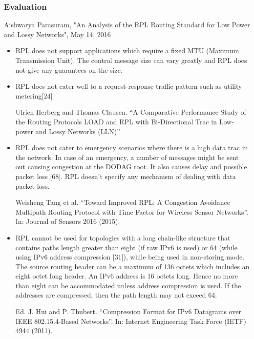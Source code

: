         \subsubsection{Evaluation}
        Aishwarya Parasuram, "An Analysis of the RPL Routing Standard for Low Power
        and Lossy Networks", May 14, 2016

        \begin{itemize}
        \item
        RPL does not support applications which require a fixed MTU (Maximum Transmission
  Unit). The control message size can vary greatly and RPL does not give any
  guarantees on the size.

        \item
        RPL does not cater well to a request-response traffic pattern such as utility metering[24]

        Ulrich Herberg and Thomas Clausen. “A Comparative Performance Study of the Routing
        Protocols LOAD and RPL with Bi-Directional Trac
        in Low-power and Lossy Networks
        (LLN)”

        \item
        RPL does not cater to emergency scenarios where there is a high data trac in the
  network. In case of an emergency, a number of messages might be sent out causing
  congestion at the DODAG root. It also causes delay and possible packet loss [68].
  RPL doesn’t specify any mechanism of dealing with data packet loss.

      Weisheng Tang et al. “Toward Improved RPL: A Congestion Avoidance Multipath
  Routing Protocol with Time Factor for Wireless Sensor Networks”. In: Journal of
  Sensors 2016 (2015).

        \item
        RPL cannot be used for topologies with a long chain-like structure that contains paths
  length greater than eight (if raw IPv6 is used) or 64 (while using IPv6 address
  compression [31]), while being used in non-storing mode. The source routing header
  can be a maximum of 136 octets which includes an eight octet long header. An IPv6
  address is 16 octets long. Hence no more than eight can be accommodated unless
  address compression is used. If the addresses are compressed, then the path length
  may not exceed 64.

        Ed. J. Hui and P. Thubert. “Compression Format for IPv6 Datagrams over IEEE
  802.15.4-Based Networks”. In: Internet Engineering Task Force (IETF) 4944 (2011).


\end{itemize}
